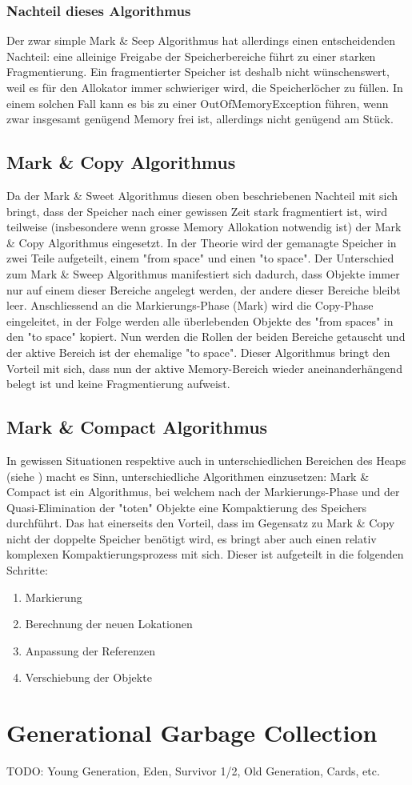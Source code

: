 \subsubsection{Nachteil dieses Algorithmus}
Der zwar simple Mark \& Seep Algorithmus hat allerdings einen entscheidenden Nachteil: eine alleinige Freigabe der Speicherbereiche führt zu einer starken Fragmentierung. Ein fragmentierter Speicher ist deshalb nicht wünschenswert, weil es für den Allokator immer schwieriger wird, die Speicherlöcher zu füllen. In einem solchen Fall kann es bis zu einer OutOfMemoryException führen, wenn zwar insgesamt genügend Memory frei ist, allerdings nicht genügend am Stück.

\subsection{Mark \& Copy Algorithmus\cite{langerkreft201005}}
Da der Mark \& Sweet Algorithmus diesen oben beschriebenen Nachteil mit sich bringt, dass der Speicher nach einer gewissen Zeit stark fragmentiert ist, wird teilweise (insbesondere wenn grosse Memory Allokation notwendig ist) der Mark \& Copy Algorithmus eingesetzt. In der Theorie wird der gemanagte Speicher in zwei Teile aufgeteilt, einem "from space" und einen "to space". Der Unterschied zum Mark \& Sweep Algorithmus manifestiert sich dadurch, dass Objekte immer nur auf einem dieser Bereiche angelegt werden, der andere dieser Bereiche bleibt leer. Anschliessend an die Markierungs-Phase (Mark) wird die Copy-Phase eingeleitet, in der Folge werden alle überlebenden Objekte des "from spaces" in den "to space" kopiert. Nun werden die Rollen der beiden Bereiche getauscht und der aktive Bereich ist der ehemalige "to space". Dieser Algorithmus bringt den Vorteil mit sich, dass nun der aktive Memory-Bereich wieder aneinanderhängend belegt ist und keine Fragmentierung aufweist.

\subsection{Mark \& Compact Algorithmus\cite{langerkreft201007}}
In gewissen Situationen respektive auch in unterschiedlichen Bereichen des Heaps (siehe ) macht es Sinn, unterschiedliche Algorithmen einzusetzen: Mark \& Compact ist ein Algorithmus, bei welchem nach der Markierungs-Phase und der Quasi-Elimination der "toten" Objekte eine Kompaktierung des Speichers durchführt. Das hat einerseits den Vorteil, dass im Gegensatz zu Mark \& Copy nicht der doppelte Speicher benötigt wird, es bringt aber auch einen relativ komplexen Kompaktierungsprozess mit sich. Dieser ist aufgeteilt in die folgenden Schritte:
\begin{enumerate}
	\item Markierung
	\item Berechnung der neuen Lokationen
	\item Anpassung der Referenzen
	\item Verschiebung der Objekte
\end{enumerate}

\section{Generational Garbage Collection\cite{langerkreft201003}}\label{generational gc}
TODO: Young Generation, Eden, Survivor 1/2, Old Generation, Cards, etc. 



